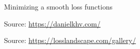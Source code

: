 \documentclass[
    xcolor={svgnames,dvipsnames},
    hyperref={colorlinks, citecolor=DeepPink4, linkcolor=DarkRed, urlcolor=DarkBlue}
    ]{beamer}  %
\newcommand{\1}{\mathbbm 1}
\begin{document}
\begin{frame}
    

    Minimizing a smooth loss functions
    
    \begin{figure}
       \begin{center}
       \end{center}
    \end{figure}

    Source: \url{https://danielkhv.com/}

\end{frame}


\begin{frame}
    
    \begin{figure}
       \begin{center}
       \end{center}
    \end{figure}

    Source: \url{https://losslandscape.com/gallery/}

\end{frame}
\end{document}
